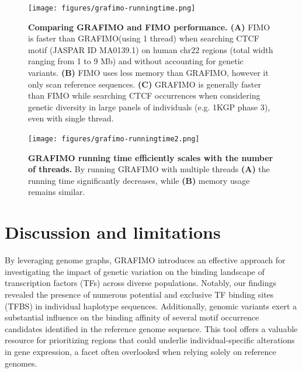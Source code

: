 \documentclass[a4paper, titlepage, openright]{book}
\newcommand{\grafimo}{GRAFIMO\xspace}
\begin{document}
\begin{figure}
    \centering
    \texttt{[image: figures/grafimo-runningtime.png]}
    \caption[Comparing \grafimo and FIMO performance]{\textbf{Comparing \grafimo and FIMO performance. (A)} FIMO is faster than \grafimo (using 1 thread) when searching CTCF motif (JASPAR ID MA0139.1) on human chr22 regions (total width ranging from 1 to 9 Mb) and without accounting for genetic variants. \textbf{(B)} FIMO uses less memory than \grafimo, however it only scan reference sequences. \textbf{(C)} \grafimo is generally faster than FIMO while searching CTCF occurrences when considering genetic diversity in large panels of individuals (e.g. 1KGP phase 3), even with single thread.}
    \label{fig:grafimo-fimo-cmp1}
\end{figure}

\begin{figure}
    \centering
    \texttt{[image: figures/grafimo-runningtime2.png]}
    \caption[\grafimo running time efficiently scales with the number of threads]{\textbf{\grafimo running time efficiently scales with the number of threads.} By running \grafimo with multiple threads \textbf{(A)} the running time significantly decreases, while \textbf{(B)} memory usage remains similar.}
    \label{fig:grafimo-fimo-cmp2}
\end{figure}

%
% 
\section{Discussion and limitations}
By leveraging genome graphs, \grafimo introduces an effective approach for investigating the impact of genetic variation on the binding landscape of transcription factors (TFs) across diverse populations. Notably, our findings revealed the presence of numerous potential and exclusive TF binding sites (TFBS) in individual haplotype sequences. Additionally, genomic variants exert a substantial influence on the binding affinity of several motif occurrence candidates identified in the reference genome sequence. This tool offers a valuable resource for prioritizing regions that could underlie individual-specific alterations in gene expression, a facet often overlooked when relying solely on reference genomes.
\end{document}
